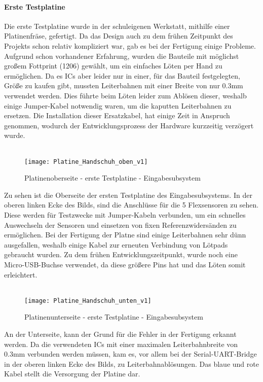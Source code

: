 \documentclass[titlepage,12pt,twoside]{article}
\begin{document}
\paragraph{Erste Testplatine}
\hfill \break
\hfill \break
Die erste Testplatine wurde in der schuleigenen Werkstatt, mithilfe einer Platinenfräse,
gefertigt. Da das Design auch zu dem frühen Zeitpunkt des Projekts schon relativ kompliziert
war, gab es bei der Fertigung einige Probleme. Aufgrund schon vorhandener Erfahrung,
wurden die Bauteile mit möglichst großem Fottprint (1206) gewählt, um ein einfaches Löten
per Hand zu ermöglichen. Da es ICs aber leider nur in einer, für das Bauteil festgelegten,
Größe zu kaufen gibt, mussten Leiterbahnen mit einer Breite von nur 0.3mm verwendet
werden. Dies führte beim Löten leider zum Ablösen dieser, weshalb einige Jumper-Kabel
notwendig waren, um die kaputten Leiterbahnen zu ersetzen. Die Installation dieser Ersatzkabel,
hat einige Zeit in Anspruch genommen, wodurch der Entwicklungsprozess der Hardware
kurzzeitig verzögert wurde. \\
\\
\begin{figure}[H]
	\begin{center}
		\scalebox{0.6}
		{\texttt{[image: Platine\_Handschuh\_oben\_v1]}}
		\caption{Platinenoberseite - erste Testplatine - Eingabesubsystem}
		\label{fig:Platine_Handschuh_oben_v1}		
	\end{center}
\end{figure}
\hfill \break
Zu sehen ist die Oberseite der ersten Testplatine des Eingabesubsystems. In der oberen linken Ecke des Bilds, sind die Anschlüsse für die 5 Flexsensoren zu sehen. Diese werden für Testzwecke mit 
Jumper-Kabeln verbunden, um ein schnelles Auswechseln der Sensoren und einsetzen von fixen Referenzwidersänden zu ermöglichen. Bei der Fertigung der Platne sind einige Leiterbahnen sehr dünn ausgefallen, 
weshalb einige Kabel zur erneuten Verbindung von Lötpads gebraucht wurden. Zu dem frühen Entwicklungszeitpunkt, wurde noch eine Micro-USB-Buchse verwendet, da diese größere Pins hat und das Löten somit erleichtert. \\
\\

\begin{figure}[H]
	\begin{center}
		\scalebox{0.6}
		{\texttt{[image: Platine\_Handschuh\_unten\_v1]}}
		\caption{Platinenunterseite - erste Testplatine - Eingabesubsystem}
		\label{fig:Platine_Handschuh_unten_v1}	
	\end{center}
\end{figure}
\hfill \break
An der Unterseite, kann der Grund für die Fehler in der Fertigung erkannt werden. Da die verwendeten ICs mit einer maximalen Leiterbahnbreite von 0.3mm verbunden werden müssen, kam es, vor allem bei der Serial-UART-Bridge in der
oberen linken Ecke des Bilds, zu Leiterbahnablösungen. Das blaue und rote Kabel stellt die Versorgung der Platine dar. 
\end{document}
